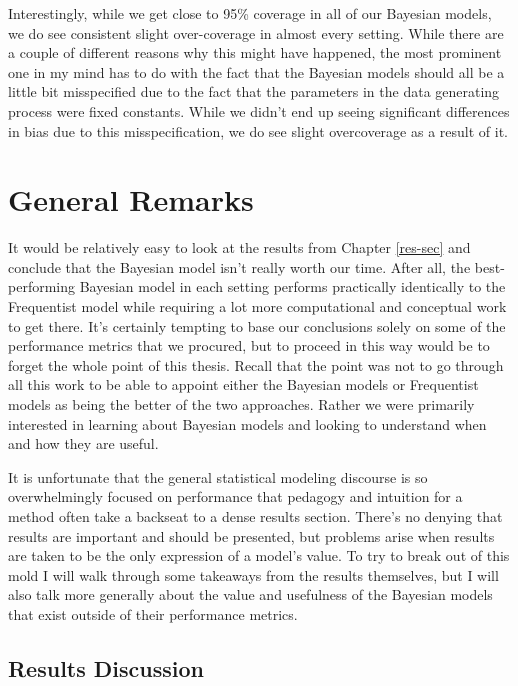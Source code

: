 \documentclass[12pt,twoside]{reedthesis}
\begin{document}
Interestingly, while we get close to 95\% coverage in all of our Bayesian models, we do see consistent slight over-coverage in almost every setting. While there are a couple of different reasons why this might have happened, the most prominent one in my mind has to do with the fact that the Bayesian models should all be a little bit misspecified due to the fact that the parameters in the data generating process were fixed constants. While we didn't end up seeing significant differences in bias due to this misspecification, we do see slight overcoverage as a result of it.

\hypertarget{general-remarks}{%
\section{General Remarks}\label{general-remarks}}

It would be relatively easy to look at the results from Chapter \ref{res-sec} and conclude that the Bayesian model isn't really worth our time. After all, the best-performing Bayesian model in each setting performs practically identically to the Frequentist model while requiring a lot more computational and conceptual work to get there. It's certainly tempting to base our conclusions solely on some of the performance metrics that we procured, but to proceed in this way would be to forget the whole point of this thesis. Recall that the point was not to go through all this work to be able to appoint either the Bayesian models or Frequentist models as being the better of the two approaches. Rather we were primarily interested in learning about Bayesian models and looking to understand when and how they are useful.

It is unfortunate that the general statistical modeling discourse is so overwhelmingly focused on performance that pedagogy and intuition for a method often take a backseat to a dense results section. There's no denying that results are important and should be presented, but problems arise when results are taken to be the only expression of a model's value. To try to break out of this mold I will walk through some takeaways from the results themselves, but I will also talk more generally about the value and usefulness of the Bayesian models that exist outside of their performance metrics.

\hypertarget{results-discussion}{%
\subsection{Results Discussion}\label{results-discussion}}
\end{document}

